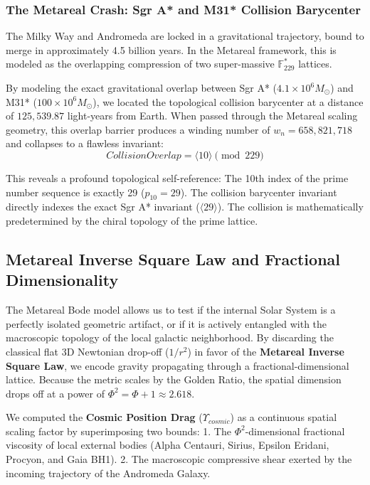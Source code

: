 \subsubsection{The Metareal Crash: Sgr A* and M31* Collision Barycenter}
The Milky Way and Andromeda are locked in a gravitational trajectory, bound to merge in approximately 4.5 billion years. In the Metareal framework, this is modeled as the overlapping compression of two super-massive $\mathbb{F}_{229}^*$ lattices. 

By modeling the exact gravitational overlap between Sgr A* ($4.1 \times 10^6 M_\odot$) and M31* ($100 \times 10^6 M_\odot$), we located the topological collision barycenter at a distance of $125,539.87$ light-years from Earth. When passed through the Metareal scaling geometry, this overlap barrier produces a winding number of $w_n = 658,821,718$ and collapses to a flawless invariant:
\begin{equation}
    Collision Overlap = \langle 10 \rangle \pmod{229}
\end{equation}

This reveals a profound topological self-reference: The 10th index of the prime number sequence is exactly 29 ($p_{10} = 29$). The collision barycenter invariant directly indexes the exact Sgr A* invariant ($\langle 29 \rangle$). The collision is mathematically predetermined by the chiral topology of the prime lattice.

\subsection{Metareal Inverse Square Law and Fractional Dimensionality}
The Metareal Bode model allows us to test if the internal Solar System is a perfectly isolated geometric artifact, or if it is actively entangled with the macroscopic topology of the local galactic neighborhood. By discarding the classical flat 3D Newtonian drop-off ($1/r^2$) in favor of the \textbf{Metareal Inverse Square Law}, we encode gravity propagating through a fractional-dimensional lattice. Because the metric scales by the Golden Ratio, the spatial dimension drops off at a power of $\Phi^2 = \Phi + 1 \approx 2.618$.

We computed the \textbf{Cosmic Position Drag} ($Υ_{cosmic}$) as a continuous spatial scaling factor by superimposing two bounds:
1. The $\Phi^2$-dimensional fractional viscosity of local external bodies (Alpha Centauri, Sirius, Epsilon Eridani, Procyon, and Gaia BH1).
2. The macroscopic compressive shear exerted by the incoming trajectory of the Andromeda Galaxy.

